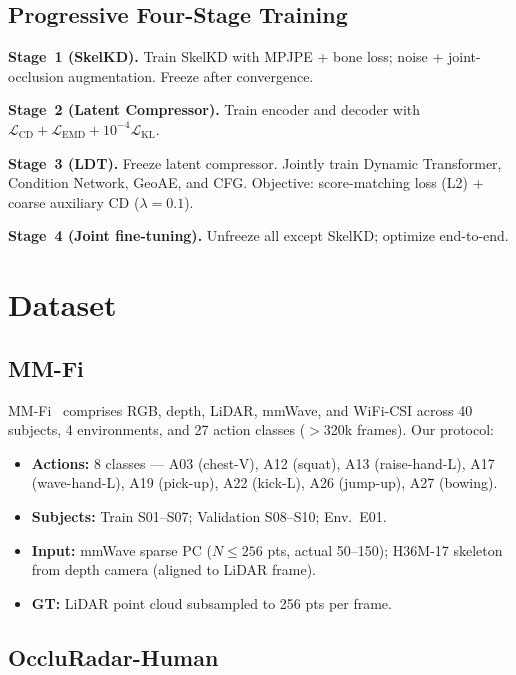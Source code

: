 \documentclass{article}
\begin{document}
\subsection{Progressive Four-Stage Training}
\label{sec:training}

\textbf{Stage~1 (SkelKD).}
Train SkelKD with MPJPE + bone loss; noise + joint-occlusion augmentation.
Freeze after convergence.

\textbf{Stage~2 (Latent Compressor).}
Train encoder and decoder with $\mathcal{L}_\text{CD}+\mathcal{L}_\text{EMD}
+10^{-4}\mathcal{L}_\text{KL}$.

\textbf{Stage~3 (LDT).}
Freeze latent compressor.
Jointly train Dynamic Transformer, Condition Network, GeoAE, and CFG.
Objective: score-matching loss (L2) + coarse auxiliary CD ($\lambda\!=\!0.1$).

\textbf{Stage~4 (Joint fine-tuning).}
Unfreeze all except SkelKD; optimize end-to-end.

\section{Dataset}
\label{sec:dataset}

\subsection{MM-Fi}
\label{sec:mmfi}

MM-Fi~\cite{yang2023mmfi} comprises RGB, depth, LiDAR, mmWave, and WiFi-CSI
across 40 subjects, 4 environments, and 27 action classes ($>$320k frames).
Our protocol:
\begin{itemize}[leftmargin=1.5em,itemsep=1pt]
  \item \textbf{Actions:} 8 classes — A03 (chest-V), A12 (squat), A13
        (raise-hand-L), A17 (wave-hand-L), A19 (pick-up), A22 (kick-L),
        A26 (jump-up), A27 (bowing).
  \item \textbf{Subjects:} Train S01--S07; Validation S08--S10; Env.\ E01.
  \item \textbf{Input:} mmWave sparse PC ($N\!\leq\!256$ pts, actual 50--150);
        H36M-17 skeleton from depth camera (aligned to LiDAR frame).
  \item \textbf{GT:} LiDAR point cloud subsampled to 256 pts per frame.
\end{itemize}

\subsection{OccluRadar-Human}
\label{sec:occludata}
\end{document}
